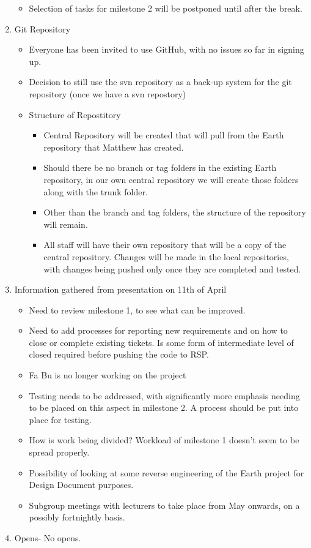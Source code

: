 \documentclass{letter}
\begin{document}
\begin{enumerate}
\begin{itemize}
	\item Selection of tasks for milestone 2 will be postponed until after the break.
	\end{itemize}
\item Git Repository
	\begin{itemize}
	\item Everyone has been invited to use GitHub, with no issues so far in signing up.
	\item Decision to still use the svn repository as a back-up system for the git repository (once we have a svn repostory)
	\item Structure of Repostitory
		\begin{itemize}
		\item Central Repository will be created that will pull from the Earth repository that Matthew has created.
		\item Should there be no branch or tag folders in the existing Earth repository, in our own central repository we will create those folders along with the trunk folder.
		\item Other than the branch and tag folders, the structure of the repository will remain.
		\item All staff will have their own repository that will be a copy of the central repository. Changes will be made in the local repositories, with changes being pushed only once they are completed and tested.
		\end{itemize}
	\end{itemize}
\item Information gathered from presentation on 11th of April
	\begin{itemize}
	\item Need to review milestone 1, to see what can be improved.
	\item Need to add processes for reporting new requirements and on how to close or complete existing tickets. Is some form of intermediate level of closed required before pushing the code to RSP.
	\item Fa Bu is no longer working on the project 
	\item Testing needs to be addressed, with significantly more emphasis needing to be placed on this aspect in milestone 2. A process should be put into place for testing.
	\item How is work being divided? Workload of milestone 1 doesn't seem to be spread properly.
	\item Possibility of looking at some reverse engineering of the Earth project for Design Document purposes.
	\item Subgroup meetings with lecturers to take place from May onwards, on a possibly fortnightly basis.
	\end{itemize}
\item Opens- No opens.
\end{enumerate} 
\end{document}
